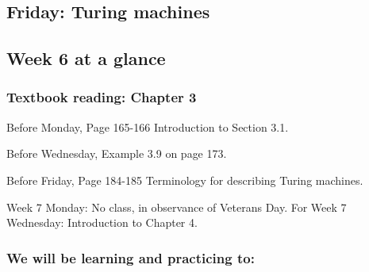 \newpage
\subsection*{Friday: Turing machines}





\newpage

\subsection*{Week 6 at a glance}

\vspace{-10pt}

\subsubsection*{Textbook reading: Chapter 3}

\vspace{-10pt}

Before Monday, Page 165-166 Introduction to Section 3.1.

\vspace{-10pt}

Before Wednesday, Example 3.9 on page 173.

\vspace{-10pt}

Before Friday, Page 184-185 Terminology for describing Turing machines.

\vspace{-10pt}

Week 7 Monday: No class, in observance of Veterans Day. For Week 7 Wednesday: Introduction to Chapter 4.

\vspace{-20pt}

\subsubsection*{We will be learning and practicing to:}
\vspace{-20pt}

